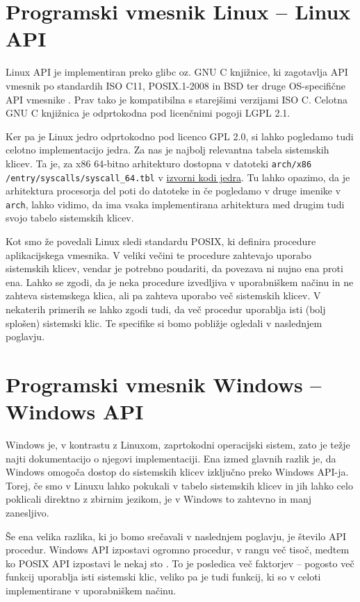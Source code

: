 \documentclass[a4paper,12pt,openright]{book}
\begin{document}
\section{Programski vmesnik Linux -- Linux API}

Linux API je implementiran preko glibc oz. GNU C knjižnice, ki zagotavlja API vmesnik po standardih ISO C11, POSIX.1-2008 in BSD ter druge OS-specifične API vmesnike \cite{GNU_Manual}.
Prav tako je kompatibilna s starejšimi verzijami ISO C.
Celotna GNU C knjižnica je odprtokodna pod licenčnimi pogoji LGPL 2.1.

Ker pa je Linux jedro odprtokodno pod licenco GPL 2.0, si lahko pogledamo tudi celotno implementacijo jedra.
Za nas je najbolj relevantna tabela sistemskih klicev.
Ta je, za x86 64-bitno arhitekturo dostopna v datoteki \texttt{arch/x86} \texttt{/entry/syscalls/syscall\_64.tbl} v \href{https://github.com/torvalds/linux}{izvorni kodi jedra}.
Tu lahko opazimo, da je arhitektura procesorja del poti do datoteke in če pogledamo v druge imenike v \texttt{arch}, lahko vidimo, da ima vsaka implementirana arhitektura med drugim tudi svojo tabelo sistemskih klicev.

Kot smo že povedali Linux sledi standardu POSIX, ki definira procedure aplikacijskega vmesnika.
V veliki večini te procedure zahtevajo uporabo sistemskih klicev, vendar je potrebno poudariti, da povezava ni nujno ena proti ena.
Lahko se zgodi, da je neka procedure izvedljiva v uporabniškem načinu in ne zahteva sistemskega klica, ali pa zahteva uporabo več sistemskih klicev.
V nekaterih primerih se lahko zgodi tudi, da več procedur uporablja isti (bolj splošen) sistemski klic.
Te specifike si bomo pobližje ogledali v naslednjem poglavju.

\section{Programski vmesnik Windows -- Windows API}

Windows je, v kontrastu z Linuxom, zaprtokodni operacijski sistem, zato je težje najti dokumentacijo o njegovi implementaciji.
Ena izmed glavnih razlik je, da Windows omogoča dostop do sistemskih klicev izključno preko Windows API-ja.
Torej, če smo v Linuxu lahko pokukali v tabelo sistemskih klicev in jih lahko celo poklicali direktno z zbirnim jezikom, je v Windows to zahtevno in manj zanesljivo.

Še ena velika razlika, ki jo bomo srečavali v naslednjem poglavju, je število API procedur.
Windows API izpostavi ogromno procedur, v rangu več tisoč, medtem ko POSIX API izpostavi le nekaj sto \cite{Tanenbaum_Bos_2023}.
To je posledica več faktorjev -- pogosto več funkcij uporablja isti sistemski klic, veliko pa je tudi funkcij, ki so v celoti implementirane v uporabniškem načinu.
\end{document}
